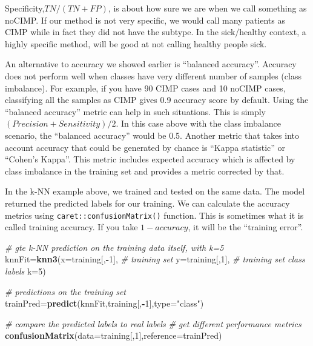 \documentclass[12pt,]{krantz}
\newenvironment{Shaded}{\begin{snugshade}}{\end{snugshade}}
\newcommand{\CommentTok}[1]{\textcolor[rgb]{0.56,0.35,0.01}{\textit{#1}}}
\newcommand{\DataTypeTok}[1]{\textcolor[rgb]{0.13,0.29,0.53}{#1}}
\newcommand{\DecValTok}[1]{\textcolor[rgb]{0.00,0.00,0.81}{#1}}
\newcommand{\KeywordTok}[1]{\textcolor[rgb]{0.13,0.29,0.53}{\textbf{#1}}}
\newcommand{\NormalTok}[1]{#1}
\newcommand{\OperatorTok}[1]{\textcolor[rgb]{0.81,0.36,0.00}{\textbf{#1}}}
\newcommand{\StringTok}[1]{\textcolor[rgb]{0.31,0.60,0.02}{#1}}
\begin{document}
Specificity,\(TN/(TN+FP)\), is about how sure we are when we call something as noCIMP. If our method is not very specific, we would call many patients as CIMP while in fact they did not have the subtype. In the sick/healthy context, a highly specific method, will be good at not calling healthy people sick.

An alternative to accuracy we showed earlier is ``balanced accuracy''. Accuracy does not perform well when classes have very different number of samples (class imbalance). For example, if you have 90 CIMP cases and 10 noCIMP cases, classifying all the samples as CIMP gives 0.9 accuracy score by default. Using the ``balanced accuracy'' metric can help in such situations. This is simply \((Precision+Sensitivity)/2\). In this case above with the class imbalance scenario, the ``balanced accuracy'' would be 0.5. Another metric that takes into account accuracy that could be generated by chance is ``Kappa statistic'' or ``Cohen's Kappa''. This metric includes expected accuracy which is affected by class imbalance in the training set and provides a metric corrected by that.

In the k-NN example above, we trained and tested on the same data. The model returned the predicted labels for our training. We can calculate the accuracy metrics using \texttt{caret::confusionMatrix()} function. This is sometimes what it is called training accuracy. If you take \(1-accuracy\), it will be the ``training error''.

\begin{Shaded}
\begin{Highlighting}[]
\CommentTok{# gte k-NN prediction on the training data itself, with k=5}
\NormalTok{knnFit=}\KeywordTok{knn3}\NormalTok{(}\DataTypeTok{x=}\NormalTok{training[,}\OperatorTok{-}\DecValTok{1}\NormalTok{], }\CommentTok{# training set}
            \DataTypeTok{y=}\NormalTok{training[,}\DecValTok{1}\NormalTok{], }\CommentTok{# training set class labels}
            \DataTypeTok{k=}\DecValTok{5}\NormalTok{)}

\CommentTok{# predictions on the training set}
\NormalTok{trainPred=}\KeywordTok{predict}\NormalTok{(knnFit,training[,}\OperatorTok{-}\DecValTok{1}\NormalTok{],}\DataTypeTok{type=}\StringTok{"class"}\NormalTok{)}

\CommentTok{# compare the predicted labels to real labels}
\CommentTok{# get different performance metrics}
\KeywordTok{confusionMatrix}\NormalTok{(}\DataTypeTok{data=}\NormalTok{training[,}\DecValTok{1}\NormalTok{],}\DataTypeTok{reference=}\NormalTok{trainPred)}
\end{Highlighting}
\end{Shaded}
\end{document}
